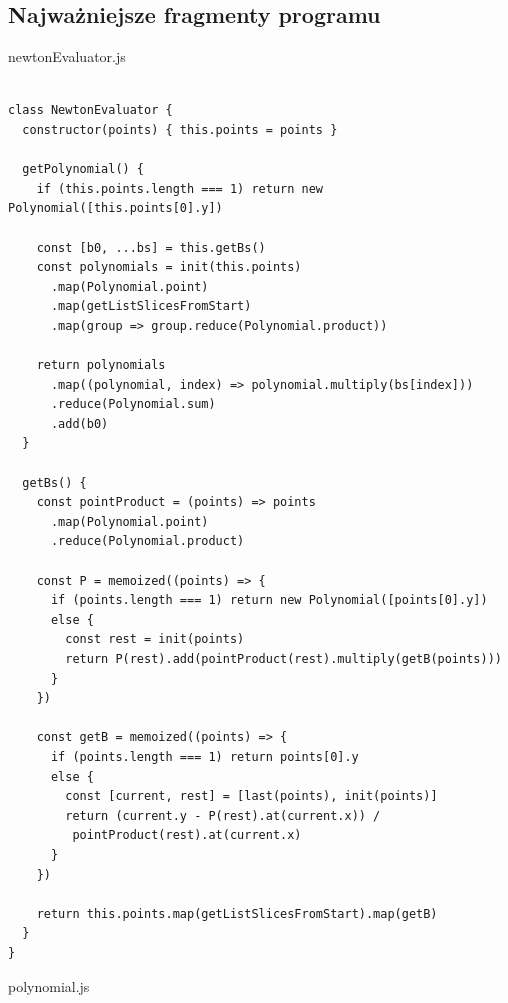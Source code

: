 \documentclass[12pt]{article}
\begin{document}
\subsection{Najważniejsze fragmenty programu}
newtonEvaluator.js
\begin{verbatim}

class NewtonEvaluator {
  constructor(points) { this.points = points }

  getPolynomial() {
    if (this.points.length === 1) return new Polynomial([this.points[0].y])

    const [b0, ...bs] = this.getBs()
    const polynomials = init(this.points)
      .map(Polynomial.point)
      .map(getListSlicesFromStart)
      .map(group => group.reduce(Polynomial.product))

    return polynomials
      .map((polynomial, index) => polynomial.multiply(bs[index]))
      .reduce(Polynomial.sum)
      .add(b0)
  }

  getBs() {
    const pointProduct = (points) => points
      .map(Polynomial.point)
      .reduce(Polynomial.product)

    const P = memoized((points) => {
      if (points.length === 1) return new Polynomial([points[0].y])
      else {
        const rest = init(points)
        return P(rest).add(pointProduct(rest).multiply(getB(points)))
      }
    })

    const getB = memoized((points) => {
      if (points.length === 1) return points[0].y
      else {
        const [current, rest] = [last(points), init(points)]
        return (current.y - P(rest).at(current.x)) /
         pointProduct(rest).at(current.x)
      }
    })

    return this.points.map(getListSlicesFromStart).map(getB)
  }
}

\end{verbatim}
polynomial.js
\end{document}
